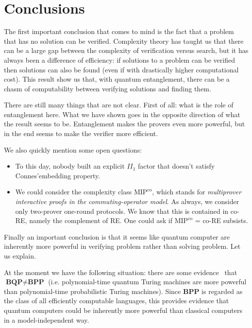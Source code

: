 \section*{Conclusions}

The first important conclusion that comes to mind is the fact that a problem that has no solution can be verified. Complexity theory has taught us that there can be a large gap between the complexity of verification versus search, but it has always been a difference of efficiency: if solutions to a problem can be verified then solutions can also be found (even if with drastically higher computational cost). This result show us that, with quantum entanglement, there can be a chasm of computability between verifying solutions and finding them.


There are still many things that are not clear. First of all: what is the role of entanglement here. What we have shown goes in the opposite direction of what the result seems to be. Entanglement makes the provers even more powerful, but in the end seems to make the verifier more efficient.

We also quickly mention some open questions:
\begin{itemize}

    \item To this day, nobody built an explicit $II_1$ factor that doesn't satisfy Connes'embedding property.
    \item We could consider the complexity class $\text{MIP}^\text{co}$, which stands for \emph{multiprover interactive proofs in the commuting-operator model}. As always, we consider only two-prover one-round protocols. We know that this is contained in co-RE, namely the complement of RE. One could ask if $\text{MIP}^\text{co}$ = co-RE subsists.
    
\end{itemize}

Finally an important conclusion is that it seems like quantum computer are inherently more powerful in verifying problem rather than solving problem. Let us explain.

At the moment we have the following situation: there are some evidence~\cite{Bennett_1997} that $\textbf{BQP} \neq \textbf{BPP}$ (i.e. polynomial-time quantum Turing machines are more powerful than polynomial-time probabilistic Turing machines). Since \textbf{BPP} is regarded as the class of all efficiently computable languages, this provides evidence that quantum computers could be inherently more powerful than classical computers in a model-independent way.

